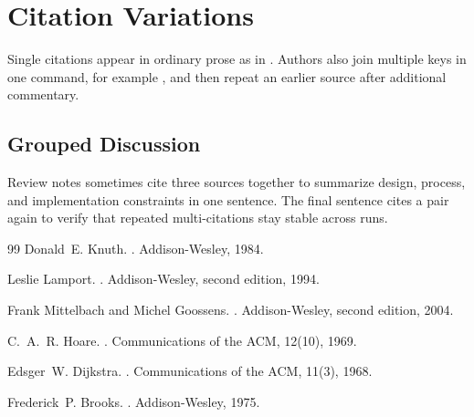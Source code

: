 \documentclass{article}
\begin{document}
\section{Citation Variations}
Single citations appear in ordinary prose as in \cite{knuth}. Authors also join
multiple keys in one command, for example \cite{lamport,mittelbach}, and then
repeat an earlier source \cite{knuth} after additional commentary.

\subsection{Grouped Discussion}
Review notes sometimes cite three sources together \cite{hoare,dijkstra,brooks}
to summarize design, process, and implementation constraints in one sentence.
The final sentence cites a pair again \cite{lamport,mittelbach} to verify that
repeated multi-citations stay stable across runs.

\begin{thebibliography}{99}
Donald~E. Knuth.
.
\newblock Addison-Wesley, 1984.

Leslie Lamport.
.
\newblock Addison-Wesley, second edition, 1994.

Frank Mittelbach and Michel Goossens.
.
\newblock Addison-Wesley, second edition, 2004.

C.~A.~R. Hoare.
.
\newblock Communications of the ACM, 12(10), 1969.

Edsger~W. Dijkstra.
.
\newblock Communications of the ACM, 11(3), 1968.

Frederick~P. Brooks.
.
\newblock Addison-Wesley, 1975.
\end{thebibliography}
\end{document}

